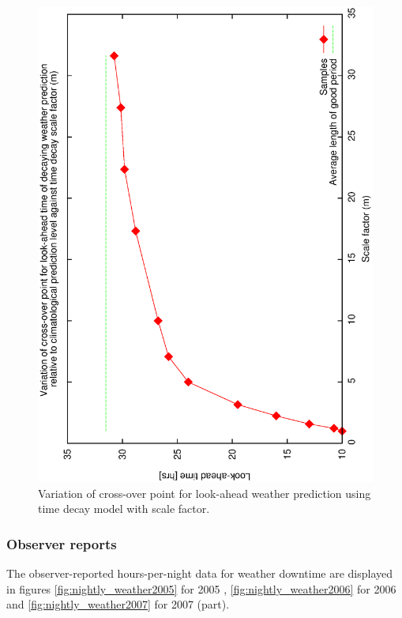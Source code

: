 {{\begin{figure}[htbp]
  \begin{center}
    \includegraphics[scale=0.4, angle=-90]{figures/ecs/m_crossover.eps}
  \end{center}   
  \caption[Variation of cross-over point for look-ahead weather prediction using time decay model with scale factor.]
  {Variation of cross-over point for look-ahead weather prediction using time decay model with scale factor.}
  \label{fig:gbc_m_crossover}
\end{figure}




\subsubsection{Observer reports}
The observer-reported hours-per-night data for weather downtime are displayed in figures \ref{fig:nightly_weather2005} for 2005 , \ref{fig:nightly_weather2006} for 2006  and \ref{fig:nightly_weather2007} for 2007 (part).

}}
